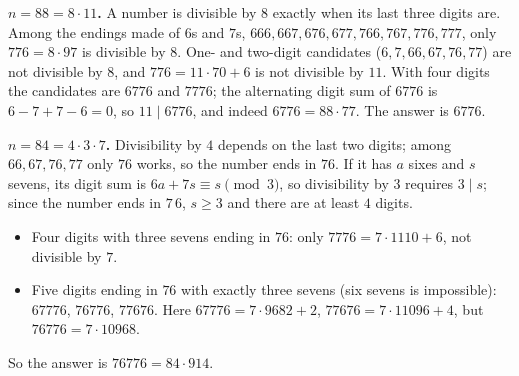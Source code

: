 \textbf{$n=88=8\cdot11$.} A number is divisible by $8$ exactly when its last three digits are. Among the endings made of $6$s and $7$s, $666,667,676,677,766,767,776,777$, only $776=8\cdot97$ is divisible by $8$. One- and two-digit candidates ($6,7,66,67,76,77$) are not divisible by $8$, and $776=11\cdot70+6$ is not divisible by $11$. With four digits the candidates are $6776$ and $7776$; the alternating digit sum of $6776$ is $6-7+7-6=0$, so $11\mid6776$, and indeed $6776=88\cdot77$. The answer is $\boxed{6776}$.

\textbf{$n=84=4\cdot3\cdot7$.} Divisibility by $4$ depends on the last two digits; among $66,67,76,77$ only $76$ works, so the number ends in $76$. If it has $a$ sixes and $s$ sevens, its digit sum is $6a+7s\equiv s\pmod3$, so divisibility by $3$ requires $3\mid s$; since the number ends in $7$\,$6$, $s\ge3$ and there are at least $4$ digits.
\begin{itemize}
\item Four digits with three sevens ending in $76$: only $7776=7\cdot1110+6$, not divisible by $7$.
\item Five digits ending in $76$ with exactly three sevens (six sevens is impossible): $67776$, $76776$, $77676$. Here $67776=7\cdot9682+2$, $77676=7\cdot11096+4$, but $76776=7\cdot10968$.
\end{itemize}
So the answer is $\boxed{76776}=84\cdot914$.
